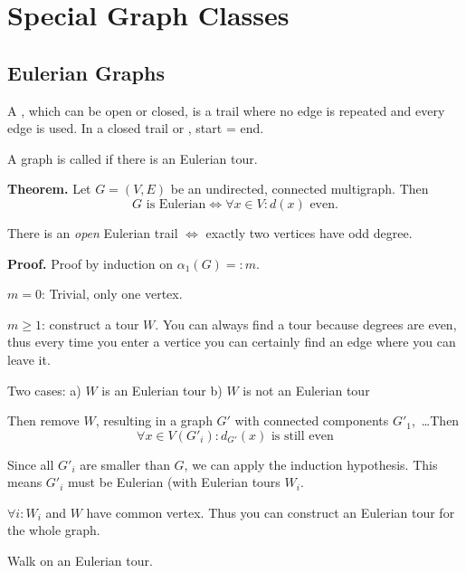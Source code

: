 
\section{Special Graph Classes}

\subsection*{Eulerian Graphs}

\begin{definition}
A , which can be open or closed, is a trail where no edge is repeated and every edge is used. In a closed trail or , start = end.
\end{definition}

\begin{definition}
A graph is called  if there is an Eulerian tour.
\end{definition}

\textbf{Theorem.}
Let $G=(V,E)$ be an undirected, connected multigraph. Then
\[
  G\text{ is Eulerian} \iff \forall x\in V: d(x)\text{ even}.
\]

There is an \emph{open} Eulerian trail $\iff$ exactly two vertices have odd degree.

\textbf{Proof.}
Proof by induction on $\alpha_1(G) =: m$.

$m = 0$: Trivial, only one vertex.

$m ≥ 1$: construct a tour $W$. You can always find a tour because degrees are even, thus every time you enter a vertice you can certainly find an edge where you can leave it.

Two cases:
a) $W$ is an Eulerian tour
b) $W$ is not an Eulerian tour

Then remove $W$, resulting in a graph $G'$ with connected components $G'_1$,~\ldots Then
\[
    \forall x\in V(G'_{i}): d_{G'}(x)\text{ is still even}
\]

Since all $G'_{i}$ are smaller than $G$, we can apply the induction hypothesis. This means $G'_{i}$ must be Eulerian (with Eulerian tours $W_{i}$.

$\forall i: W_i$ and $W$ have common vertex. Thus you can construct an Eulerian tour for the whole graph.



Walk on an Eulerian tour. 











